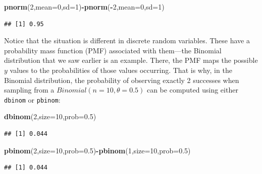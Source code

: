 \documentclass[12pt,]{krantz}
\newenvironment{Shaded}{\begin{snugshade}}{\end{snugshade}}
\newcommand{\DataTypeTok}[1]{\textcolor[rgb]{0.13,0.29,0.53}{#1}}
\newcommand{\DecValTok}[1]{\textcolor[rgb]{0.00,0.00,0.81}{#1}}
\newcommand{\FloatTok}[1]{\textcolor[rgb]{0.00,0.00,0.81}{#1}}
\newcommand{\KeywordTok}[1]{\textcolor[rgb]{0.13,0.29,0.53}{\textbf{#1}}}
\newcommand{\NormalTok}[1]{#1}
\newcommand{\OperatorTok}[1]{\textcolor[rgb]{0.81,0.36,0.00}{\textbf{#1}}}
\theoremstyle{definition}
\theoremstyle{definition}
\theoremstyle{definition}
\theoremstyle{remark}
\begin{document}
\begin{Shaded}
\begin{Highlighting}[]
\KeywordTok{pnorm}\NormalTok{(}\DecValTok{2}\NormalTok{,}\DataTypeTok{mean=}\DecValTok{0}\NormalTok{,}\DataTypeTok{sd=}\DecValTok{1}\NormalTok{)}\OperatorTok{-}\KeywordTok{pnorm}\NormalTok{(}\OperatorTok{-}\DecValTok{2}\NormalTok{,}\DataTypeTok{mean=}\DecValTok{0}\NormalTok{,}\DataTypeTok{sd=}\DecValTok{1}\NormalTok{)}
\end{Highlighting}
\end{Shaded}

\begin{verbatim}
## [1] 0.95
\end{verbatim}

Notice that the situation is different in discrete random variables. These have a probability mass function (PMF) associated with them---the Binomial distribution that we saw earlier is an example. There, the PMF maps the possible \(y\) values to the probabilities of those values occurring. That is why, in the Binomial distribution, the probability of observing exactly 2 successes when sampling from a \(Binomial(n=10,\theta=0.5)\) can be computed using either \texttt{dbinom} or \texttt{pbinom}:

\begin{Shaded}
\begin{Highlighting}[]
\KeywordTok{dbinom}\NormalTok{(}\DecValTok{2}\NormalTok{,}\DataTypeTok{size=}\DecValTok{10}\NormalTok{,}\DataTypeTok{prob=}\FloatTok{0.5}\NormalTok{)}
\end{Highlighting}
\end{Shaded}

\begin{verbatim}
## [1] 0.044
\end{verbatim}

\begin{Shaded}
\begin{Highlighting}[]
\KeywordTok{pbinom}\NormalTok{(}\DecValTok{2}\NormalTok{,}\DataTypeTok{size=}\DecValTok{10}\NormalTok{,}\DataTypeTok{prob=}\FloatTok{0.5}\NormalTok{)}\OperatorTok{-}\KeywordTok{pbinom}\NormalTok{(}\DecValTok{1}\NormalTok{,}\DataTypeTok{size=}\DecValTok{10}\NormalTok{,}\DataTypeTok{prob=}\FloatTok{0.5}\NormalTok{)}
\end{Highlighting}
\end{Shaded}

\begin{verbatim}
## [1] 0.044
\end{verbatim}
\end{document}

